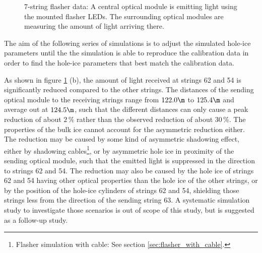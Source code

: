 \begin{figure}[htbp]
  \hfill
  \caption{7-string flasher data: A central optical module is emitting light using the mounted flasher LEDs. The surrounding optical modules are measuring the amount of light arriving there.}
  \label{fig:ea9Zieh0}
\end{figure}

The aim of the following series of simulations is to adjust the simulated hole-ice parameters until the the simulation is able to reproduce the calibration data in order to find the hole-ice parameters that best match the calibration data.


As shown in figure \ref{fig:ea9Zieh0} (b), the amount of light received at strings 62 and 54 is significantly reduced compared to the other strings. The distances of the sending optical module to the receiving strings range from $122.0\m$ to $125.4\m$ and average out at $124.5\m$, such that the different distances can only cause a peak reduction of about $2\,\%$ rather than the observed reduction of about $30\,\%$.
The properties of the bulk ice cannot account for the asymmetric reduction either.
The reduction may be caused by some kind of asymmetric shadowing effect, either by shadowing cables\footnote{Flasher simulation with cable: See section \ref{sec:flasher_with_cable}.}, or by asymmetric hole ice in proximity of the sending optical module, such that the emitted light is suppressed in the direction to strings 62 and 54. The reduction may also be caused by the hole ice of strings 62 and 54 having other optical properties than the hole ice of the other strings, or by the position of the hole-ice cylinders of strings 62 and 54, shielding those strings less from the direction of the sending string 63. A systematic simulation study to investigate those scenarios is out of scope of this study, but is suggested as a follow-up study.\followup

